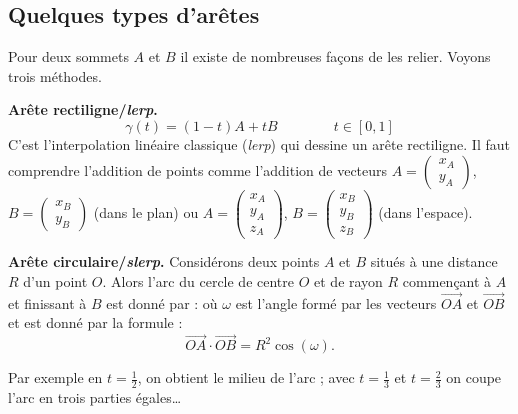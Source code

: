 \documentclass[11pt,class=report,crop=false]{standalone}
\begin{document}
\subsection{Quelques types d'arêtes}

Pour deux sommets $A$ et $B$ il existe de nombreuses façons de les relier.
Voyons trois méthodes.
	
\textbf{Arête rectiligne/\emph{lerp}.}
$$\gamma(t) = (1-t)A + tB \qquad \qquad t \in [0,1]$$
C'est l'interpolation linéaire classique (\emph{lerp}) qui dessine un arête rectiligne.
Il faut comprendre l'addition de points	comme l'addition de vecteurs 
$A= \left( \begin{smallmatrix} x_A \\ y_A \end{smallmatrix}\right)$,
$B= \left( \begin{smallmatrix} x_B \\ y_B \end{smallmatrix}\right)$ (dans le plan)
ou 
$A= \left( \begin{smallmatrix} x_A \\ y_A \\ z_A \end{smallmatrix}\right)$,
$B= \left( \begin{smallmatrix} x_B \\ y_B \\ z_B \end{smallmatrix}\right)$ (dans l'espace).


\bigskip

\textbf{Arête circulaire/\emph{slerp}.}
Considérons deux points $A$ et $B$ situés à une distance $R$ d'un point $O$.
Alors l'arc du cercle de centre $O$ et de rayon $R$ commençant à $A$ et finissant à $B$ est donné par :
où $\omega$ est l'angle formé par les vecteurs $\vec{OA}$ et $\vec{OB}$ et est donné par la formule :
$$\vec{OA} \cdot \vec{OB} = R^2 \cos(\omega).$$


Par exemple en $t=\frac12$, on obtient le milieu de l'arc ; avec $t=\frac13$ et $t=\frac23$ on coupe l'arc en trois parties égales\ldots
\end{document}
